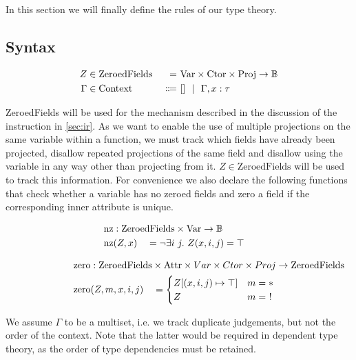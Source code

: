 In this section we will finally define the rules of our type theory.

\subsection{Syntax}

\newcommand{\ZeroedFields}{\mathrm{ZeroedFields}}
\newcommand{\Context}{\mathrm{Context}}

\begin{alignat*}{3}
	Z &\in \ZeroedFields\ &=&\ \Var \times \Ctor \times \Proj \to \mathbb{B} \\
	\Gamma &\in \Context  &\Coloneqq&\ [] \sep \Gamma, x : \tau
\end{alignat*}

ZeroedFields will be used for the mechanism described in the discussion of the  instruction in \cref{sec:ir}. As we want to enable the use of multiple projections on the same variable within a function, we must track which fields have already been projected, disallow repeated projections of the same field and disallow using the variable in any way other than projecting from it. $Z \in \ZeroedFields$ will be used to track this information. For convenience we also declare the following functions that check whether a variable has no zeroed fields and zero a field if the corresponding inner attribute is unique. 

\newcommand{\nz}{\mathrm{nz}}

\begin{alignat*}{3}
	\nz &: \mathrlap{\ZeroedFields \times \Var \to \mathbb{B}} \\
	\nz&(Z, x) &&= \lnot \exists i\ j.\ Z(x, i, j) = \top
\end{alignat*}

\newcommand{\zeroo}{\mathrm{zero}}

\begin{alignat*}{3}
	\zeroo &: \mathrlap{\ZeroedFields \times \Attr \times Var \times Ctor \times Proj \to \ZeroedFields} \\
	\zeroo&(Z, m, x, i, j) &&= \begin{cases}
		Z[(x, i, j) \mapsto \top] & m = * \\
		Z & m =\ !
	\end{cases}
\end{alignat*}

We assume $\Gamma$ to be a multiset, i.e. we track duplicate judgements, but not the order of the context. Note that the latter would be required in dependent type theory, as the order of type dependencies must be retained.

